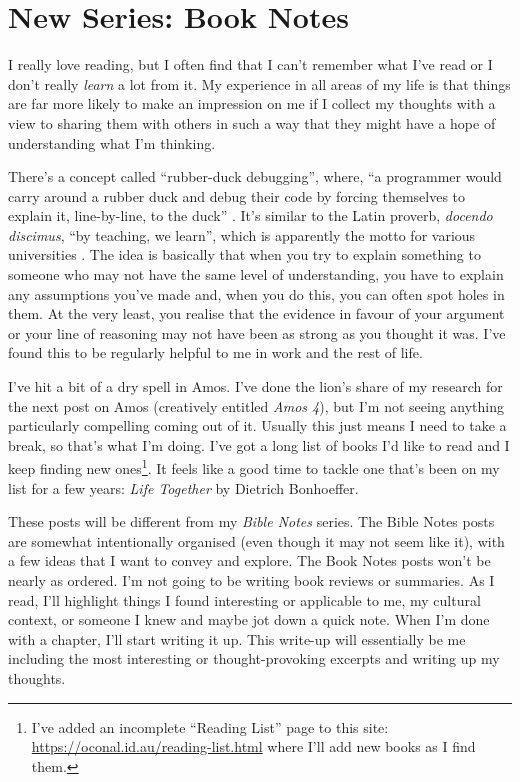 \newcommand{\Date}{June 22, 2019}
\newcommand{\Title}{Book Notes: \textit{Life Together} (Chapter 1)}



\section{New Series: Book Notes}

I really love reading, but I often find that I can't remember what I've read
or I don't really \emph{learn} a lot from it. My experience in all areas of my
life is that things are far more likely to make an impression on me if I collect
my thoughts with a view to sharing them with others in such a way that they
might have a hope of understanding what I'm thinking.

There's a concept called \enquote{rubber-duck debugging}, where, \enquote{a
programmer would carry around a rubber duck and debug their code by forcing
themselves to explain it, line-by-line, to the duck}
\autocite{wikipedia:rubber-duck-debugging}. It's similar to the Latin proverb,
\textit{docendo discimus}, \enquote{by teaching, we learn}, which is apparently
the motto for various universities
\autocite{wikipedia:docendo-discimus}. The idea is basically that when you try
to explain something to someone who may not have the same level of
understanding, you have to explain any assumptions you've made and, when you do
this, you can often spot holes in them. At the very least, you realise that the
evidence in favour of your argument or your line of reasoning may not have been
as strong as you thought it was. I've found this to be regularly helpful to me
in work and the rest of life.

I've hit a bit of a dry spell in Amos. I've done the lion's share of my research
for the next post on Amos (creatively entitled \textit{Amos 4}), but I'm not
seeing anything particularly compelling coming out of it. Usually this just
means I need to take a break, so that's what I'm doing. I've got a long list of
books I'd like to read and I keep finding new ones\footnote{%
    I've added an incomplete \enquote{Reading List} page to this site:
    \url{https://oconal.id.au/reading-list.html} where I'll add new books as I
    find them.
}. It feels like a good time to tackle one that's been on my list for a few
years: \textit{Life Together} by Dietrich Bonhoeffer.

These posts will be different from my \textit{Bible Notes} series. The Bible
Notes posts are somewhat intentionally organised (even though it may not seem
like it), with a few ideas that I want to convey and explore. The Book Notes
posts won't be nearly as ordered. I'm not going to be writing book reviews or
summaries. As I read, I'll highlight things I found interesting or applicable to
me, my cultural context, or someone I knew and maybe jot down a quick note.
When I'm done with a chapter, I'll start writing it up. This write-up will
essentially be me including the most interesting or thought-provoking excerpts
and writing up my thoughts.

